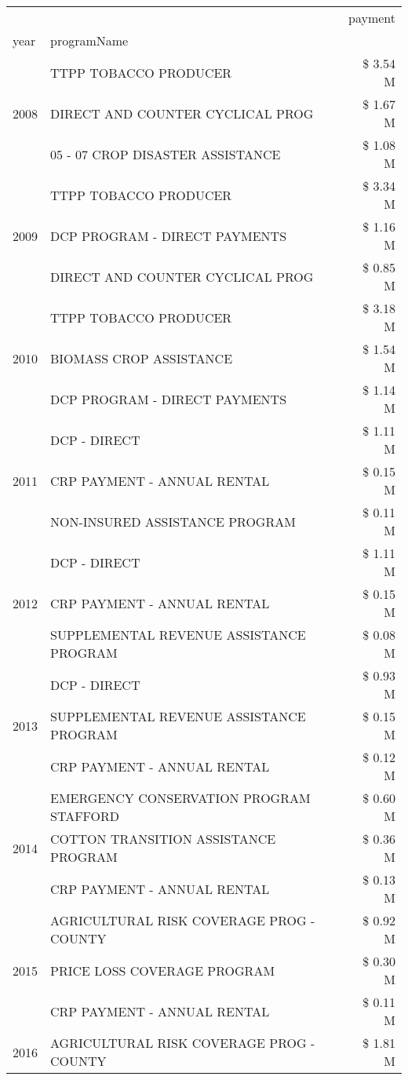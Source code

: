 \begin{tabular}{llr}
\toprule
 &  & payment \\
year & programName &  \\
\midrule
\multirow[t]{3}{*}{2008} & TTPP TOBACCO PRODUCER & \$ 3.54 M \\
 & DIRECT AND COUNTER CYCLICAL PROG & \$ 1.67 M \\
 & 05 - 07 CROP DISASTER ASSISTANCE & \$ 1.08 M \\
\cline{1-3}
\multirow[t]{3}{*}{2009} & TTPP TOBACCO PRODUCER & \$ 3.34 M \\
 & DCP PROGRAM - DIRECT PAYMENTS & \$ 1.16 M \\
 & DIRECT AND COUNTER CYCLICAL PROG & \$ 0.85 M \\
\cline{1-3}
\multirow[t]{3}{*}{2010} & TTPP TOBACCO PRODUCER & \$ 3.18 M \\
 & BIOMASS CROP ASSISTANCE & \$ 1.54 M \\
 & DCP PROGRAM - DIRECT PAYMENTS & \$ 1.14 M \\
\cline{1-3}
\multirow[t]{3}{*}{2011} & DCP - DIRECT & \$ 1.11 M \\
 & CRP PAYMENT - ANNUAL RENTAL & \$ 0.15 M \\
 & NON-INSURED ASSISTANCE PROGRAM & \$ 0.11 M \\
\cline{1-3}
\multirow[t]{3}{*}{2012} & DCP - DIRECT & \$ 1.11 M \\
 & CRP PAYMENT - ANNUAL RENTAL & \$ 0.15 M \\
 & SUPPLEMENTAL REVENUE ASSISTANCE PROGRAM & \$ 0.08 M \\
\cline{1-3}
\multirow[t]{3}{*}{2013} & DCP - DIRECT & \$ 0.93 M \\
 & SUPPLEMENTAL REVENUE ASSISTANCE PROGRAM & \$ 0.15 M \\
 & CRP PAYMENT - ANNUAL RENTAL & \$ 0.12 M \\
\cline{1-3}
\multirow[t]{3}{*}{2014} & EMERGENCY CONSERVATION PROGRAM STAFFORD & \$ 0.60 M \\
 & COTTON TRANSITION ASSISTANCE PROGRAM & \$ 0.36 M \\
 & CRP PAYMENT - ANNUAL RENTAL & \$ 0.13 M \\
\cline{1-3}
\multirow[t]{3}{*}{2015} & AGRICULTURAL RISK COVERAGE PROG - COUNTY & \$ 0.92 M \\
 & PRICE LOSS COVERAGE PROGRAM & \$ 0.30 M \\
 & CRP PAYMENT - ANNUAL RENTAL & \$ 0.11 M \\
\cline{1-3}
\multirow[t]{3}{*}{2016} & AGRICULTURAL RISK COVERAGE PROG - COUNTY & \$ 1.81 M \\

\end{tabular}
